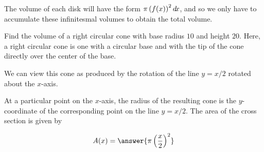 \documentclass{ximera}
\begin{document}
The volume of each disk will have the form $\pi \left( f(x)\right)^2 \mathop{}\!d\! x$, and so we only have to accumulate these infinitesmal volumes to obtain the total volume.

\begin{example}
Find the volume of a right circular cone with base radius $10$ and
height $20$. Here, a right circular cone is one with a circular base and
with the tip of the cone directly over the center of the base.









We can view this cone as produced by the rotation of the line
$y=x/2$ rotated about the $x$-axis.

At a particular point on the $x$-axis, the radius of the resulting
cone is the $y$-coordinate of the corresponding point on the line
$y=x/2$. The area of the cross section is given by

\begin{question}
\[
A(x) = \answer{\pi \left(\frac{x}{2}\right)^2}
\]


\end{question}
\end{example}
\end{document}
